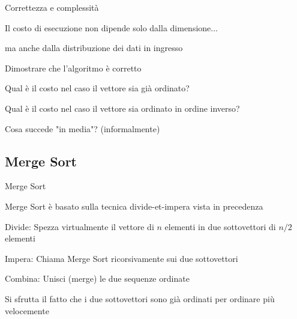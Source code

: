 \begin{frame}{Correttezza e complessità}

\begin{myboxtitle}
\BI
\item Il costo di esecuzione non dipende solo dalla dimensione...
\item ma anche dalla distribuzione dei dati in ingresso
\EI
\end{myboxtitle}

\begin{myboxtitle}[Domande]
\BI
\item Dimostrare che l'algoritmo è corretto
\item Qual è il costo nel caso il vettore sia già ordinato?
\item Qual è il costo nel caso il vettore sia ordinato in ordine inverso?
\item Cosa succede "in media"? (informalmente)
\EI
\end{myboxtitle}

\end{frame}

\subsection{Merge Sort}

\begin{frame}{Merge Sort}
	
\begin{myboxtitle}
Merge Sort è basato sulla tecnica \alert{divide-et-impera} vista in precedenza	
\BI
\item \alert{Divide}: Spezza virtualmente il vettore di $n$ elementi in due sottovettori di $n/2$ elementi
\item \alert{Impera}: Chiama Merge Sort ricorsivamente sui due sottovettori
\item \alert{Combina}: Unisci (\alert{merge}) le due sequenze ordinate 
\EI
\end{myboxtitle}

\begin{myboxtitle}[Idea]
Si sfrutta il fatto che i due sottovettori sono già ordinati per ordinare più velocemente
\end{myboxtitle}
	
\end{frame}



